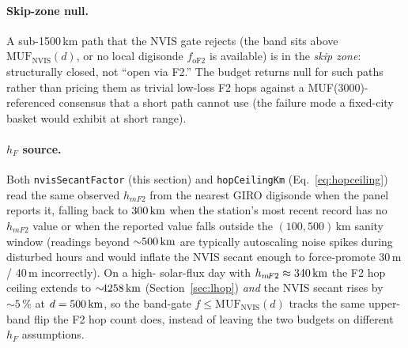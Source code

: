 \documentclass[11pt,a4paper]{article}
\newcommand{\SI}[2]{#1\,\text{#2}}
\newcommand{\km}{\text{km}}
\begin{document}
\paragraph{Skip-zone null.}  A sub-1500\,km path that the NVIS
gate rejects (the band sits above
$\text{MUF}_{\text{NVIS}}(d)$, or no local digisonde
$f_{\text{oF2}}$ is available) is in the \emph{skip zone}:
structurally closed, not ``open via F2.''  The budget returns
null for such paths rather than pricing them as trivial low-loss
F2 hops against a MUF(3000)-referenced consensus that a short
path cannot use (the failure mode a
fixed-city basket would exhibit at short range).

\paragraph{$h_F$ source.}  Both \texttt{nvisSecantFactor} (this
section) and \texttt{hopCeilingKm} (Eq.~\ref{eq:hopceiling}) read
the same observed $h_{m\!F2}$ from the nearest GIRO digisonde when
the panel reports it, falling back to $\SI{300}{\km}$ when the
station's most recent record has no $h_{m\!F2}$ value or when the
reported value falls outside the $(100, 500)$\,km sanity window
(readings beyond ${\sim}\SI{500}{\km}$ are typically autoscaling
noise spikes during disturbed hours and would inflate the NVIS
secant enough to force-promote 30\,m / 40\,m incorrectly).  On a high-
solar-flux day with $h_{m\!F2} \approx \SI{340}{\km}$ the F2 hop
ceiling extends to ${\sim}\!\SI{4258}{\km}$
(Section~\ref{sec:lhop}) \emph{and} the NVIS secant rises by
${\sim}\!5\,\%$ at $d = \SI{500}{\km}$, so the band-gate
$f \le \text{MUF}_{\text{NVIS}}(d)$ tracks the same upper-band
flip the F2 hop count does, instead of leaving the two budgets
on different $h_F$ assumptions.
\end{document}
